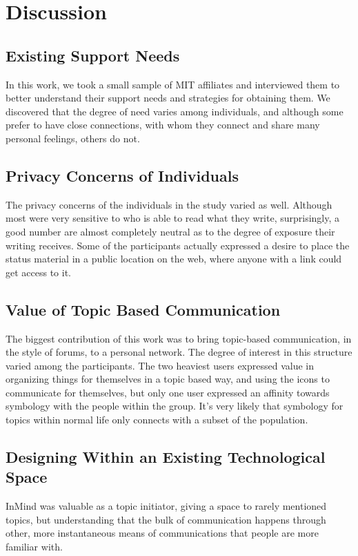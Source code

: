 \chapter{Discussion}
\section{Existing Support Needs}
	In this work, we took a small sample of MIT affiliates and interviewed
	them to better understand their support needs and strategies for
	obtaining them.
	We discovered that the degree of need varies among individuals,
	and although some prefer to have close connections,
	with whom they connect and share many personal feelings,
	others do not.

\section{Privacy Concerns of Individuals}
	The privacy concerns of the individuals in the study varied as well.
	Although most were very sensitive to who is able to read what they write,
	surprisingly, a good number are almost completely neutral as to the
	degree of exposure their writing receives.
	Some of the participants actually expressed a desire to place
	the status material in a public location on the web,
	where anyone with a link could get access to it.

\section{Value of Topic Based Communication}
	The biggest contribution of this work was to bring topic-based communication,
	in the style of forums, to a personal network.
	The degree of interest in this structure varied among the participants.
	The two heaviest users expressed value in organizing things for themselves
	in a topic based way, and using the icons to communicate for themselves,
	but only one user expressed an affinity towards symbology with the people
	within the group.
  It's very likely that symbology for topics within normal life only
	connects with a subset of the population.

\section{Designing Within an Existing Technological Space}
	InMind was valuable as a topic initiator,
	giving a space to rarely mentioned topics,
	but understanding that the bulk of communication happens through other,
	more instantaneous means of communications that
	people are more familiar with.

